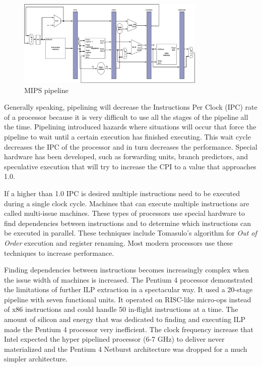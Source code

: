 \begin{figure}[ht]
\centering
\includegraphics[width=0.8\textwidth]{1_introduction/img/MIPS_pipe.png}
\caption{MIPS pipeline \cite{John-L.-Hennessy:2009wq}}
\label{fig:mips_pipe}
\end{figure}

Generally speaking, pipelining will decrease the Instructions Per Clock (IPC) rate of a processor because it is very difficult to use all the stages of the pipeline all the time. Pipelining introduced hazards where situations will occur that force the pipeline to wait until a certain execution has finished executing. This wait cycle decreases the IPC of the processor and in turn decreases the performance. Special hardware has been developed, such as forwarding units, branch predictors, and speculative execution that will try to increase the CPI to a value that approaches 1.0. 

If a higher than 1.0 IPC is desired multiple instructions need to be executed during a single clock cycle. Machines that can execute multiple instructions are called multi-issue machines. These types of processors use special hardware to find dependencies between instructions and to determine which instructions can be executed in parallel. These techniques include Tomasulo's algorithm for \emph{Out of Order} execution and register renaming. Most modern processors use these techniques to increase performance.

Finding dependencies between instructions becomes increasingly complex when the issue width of machines is increased. The Pentium 4 processor demonstrated the limitations of further ILP extraction in a spectacular way. It used a 20-stage pipeline \cite{John-L.-Hennessy:2012bs} with seven functional units. It operated on RISC-like micro-ops instead of x86 instructions and could handle 50 in-flight instructions at a time. The amount of silicon and energy that was dedicated to finding and executing ILP made the Pentium 4 processor very inefficient. The clock frequency increase that Intel expected the hyper pipelined processor (6-7 GHz) to deliver never materialized and the Pentium 4 Netburst architecture was dropped for a much simpler architecture.

